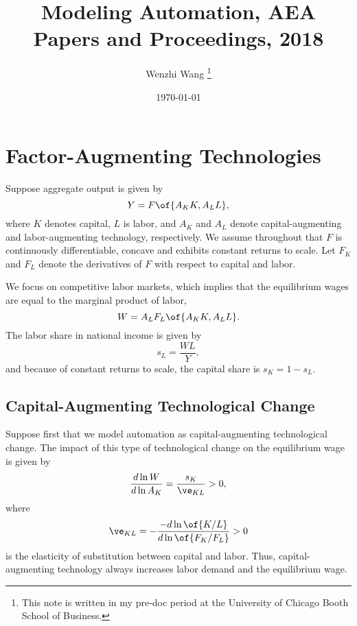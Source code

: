 \documentclass[12pt]{article}
\theoremstyle{definition}
\begin{document}

\title{\bf Modeling Automation, AEA Papers and Proceedings, 2018}
\author{Wenzhi Wang \thanks{This note is written in my pre-doc period at the University of Chicago Booth School of Business.} } 
\date{\today}
\maketitle

\citet{acemogluModelingAutomation2018}

\section{Factor-Augmenting Technologies}

Suppose aggregate output is given by 
\begin{equation}
    \notag 
    Y = F\of{A_K K, A_L L},
\end{equation}
where $K$ denotes capital, $L$ is labor, and $A_K$ and $A_L$ denote capital-augmenting and labor-augmenting technology, respectively. We assume throughout that $F$ is continuously differentiable, concave and exhibits constant returns to scale. Let $F_K$ and $F_L$ denote the derivatives of $F$ with respect to capital and labor. 

We focus on competitive labor markets, which implies that the equilibrium wages are equal to the marginal product of labor, 
$$
W = A_L F_L\of{A_K K, A_L L}.
$$
The labor share in national income is given by 
$$
s_L = \frac{WL}{Y},
$$
and because of constant returns to scale, the capital share is $s_K = 1 - s_L$.

\subsection{Capital-Augmenting Technological Change}

Suppose first that we model automation as capital-augmenting technological change. The impact of this type of technological change on the equilibrium wage is given by 
\begin{equation}
    \label{eq_catc}
    \frac{d \ln W}{d \ln A_K} = \frac{s_K}{\ve_{KL}} > 0,
\end{equation}
where 
\begin{equation}
    \label{eq_elasticity_of_substitution}
    \ve_{KL} = - \frac{- d \ln \of{K / L}}{d \ln \of{F_K / F_L}} > 0
\end{equation}
is the elasticity of substitution between capital and labor. Thus, capital-augmenting technology always increases labor demand and the equilibrium wage.
\end{document}
